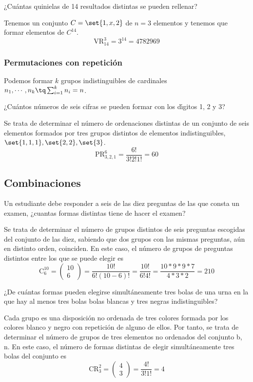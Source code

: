 \begin{example}
	¿Cuántas quinielas de 14 resultados distintas se pueden rellenar?

	Tenemos un conjunto $C=\set{1, x, 2}$ de $n=3$ elementos y tenemos que formar elementos de $C^{14}$.
	\[
		\text{VR}^{3}_{14} = 3^{14}=4782969
	\]
\end{example}

\subsubsection{Permutaciones con repetición}
Podemos formar $k$ grupos indistinguibles de cardinales $n_1,\cdots, n_k\tq \sum_{i=1}^k n_i=n$.


\begin{example}
	¿Cuántos números de seis cifras se pueden formar con los dı́gitos 1, 2 y 3?

	Se trata de determinar el número de ordenaciones distintas de un conjunto de seis elementos formados por tres
	grupos distintos de elementos indistinguibles, $\set{1, 1, 1}, \set{2, 2}, \set{3}$.
	\[
		\text{PR}^6_{3,2,1}=\frac{6!}{3! 2! 1!}=60
	\]
\end{example}

\subsection{Combinaciones}

\begin{example}
	Un estudiante debe responder a seis de las diez preguntas de las que consta un examen, ¿cuantas formas distintas tiene de hacer el examen?

	Se trata de determinar el número de grupos distintos de seis preguntas escogidas del conjunto de las diez, sabiendo que dos grupos con las mismas preguntas, aún en distinto orden, coinciden.
	En este caso, el número de grupos de preguntas distintos entre los que se puede elegir es
	\[
		\text{C}^{10}_6 = \begin{pmatrix*}
			                  10\\6
		\end{pmatrix*} =\frac{10!}{6!(10-6)!}=\frac{10!}{6!4!}=\frac{10*9*9*7}{4*3*2}=210
	\]
\end{example}

\begin{example}
	¿De cuántas formas pueden elegirse simultáneamente tres bolas de una urna en la que hay al menos tres bolas bolas blancas y tres negras indistinguibles?

	Cada grupo es una disposición no ordenada de tres colores formada por los colores blanco y negro con repetición de alguno de ellos.
	Por tanto, se trata de determinar el número de grupos de tres elementos no ordenados del conjunto {b, n}.
	En este caso, el número de formas distintas de elegir simultáneamente tres bolas del conjunto es
	\[
		\text{CR}^2_3=\begin{pmatrix*}
			              4\\3
		\end{pmatrix*} =\frac{4!}{3!1!}=4
	\]
\end{example}